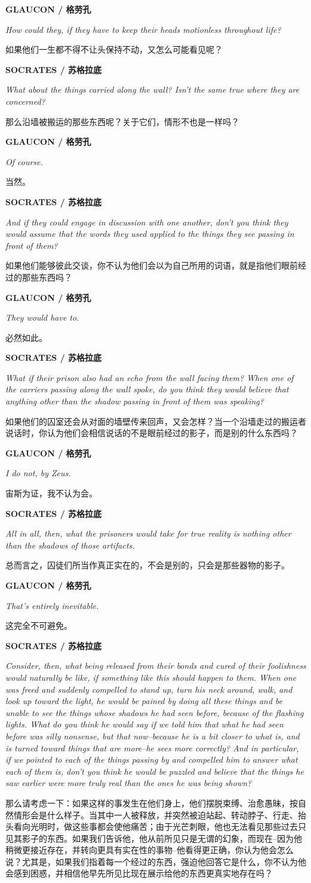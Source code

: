 \documentclass[UTF8]{ctexart}
\newcommand{\speaker}[2]{\par\medskip\noindent\textbf{#1 / #2}\par}
\newcommand{\en}[1]{\noindent\textit{#1}\par}
\newcommand{\zh}[1]{\noindent #1\par}
\begin{document}
\speaker{GLAUCON}{格劳孔}
\en{How could they, if they have to keep their heads motionless throughout life?}
\zh{如果他们一生都不得不让头保持不动，又怎么可能看见呢？}

\speaker{SOCRATES}{苏格拉底}
\en{What about the things carried along the wall? Isn't the same true where they are concerned?}
\zh{那么沿墙被搬运的那些东西呢？关于它们，情形不也是一样吗？}

\speaker{GLAUCON}{格劳孔}
\en{Of course.}
\zh{当然。}

\speaker{SOCRATES}{苏格拉底}
\en{And if they could engage in discussion with one another, don't you think they would assume that the words they used applied to the things they see passing in front of them?}
\zh{如果他们能够彼此交谈，你不认为他们会以为自己所用的词语，就是指他们眼前经过的那些东西吗？}

\speaker{GLAUCON}{格劳孔}
\en{They would have to.}
\zh{必然如此。}

\speaker{SOCRATES}{苏格拉底}
\en{What if their prison also had an echo from the wall facing them? When one of the carriers passing along the wall spoke, do you think they would believe that anything other than the shadow passing in front of them was speaking?}
\zh{如果他们的囚室还会从对面的墙壁传来回声，又会怎样？当一个沿墙走过的搬运者说话时，你认为他们会相信说话的不是眼前经过的影子，而是别的什么东西吗？}

\speaker{GLAUCON}{格劳孔}
\en{I do not, by Zeus.}
\zh{宙斯为证，我不认为会。}

\speaker{SOCRATES}{苏格拉底}
\en{All in all, then, what the prisoners would take for true reality is nothing other than the shadows of those artifacts.}
\zh{总而言之，囚徒们所当作真正实在的，不会是别的，只会是那些器物的影子。}

\speaker{GLAUCON}{格劳孔}
\en{That's entirely inevitable.}
\zh{这完全不可避免。}

\speaker{SOCRATES}{苏格拉底}
\en{Consider, then, what being released from their bonds and cured of their foolishness would naturally be like, if something like this should happen to them. When one was freed and suddenly compelled to stand up, turn his neck around, walk, and look up toward the light, he would be pained by doing all these things and be unable to see the things whose shadows he had seen before, because of the flashing lights. What do you think he would say if we told him that what he had seen before was silly nonsense, but that now--because he is a bit closer to what is, and is turned toward things that are more--he sees more correctly? And in particular, if we pointed to each of the things passing by and compelled him to answer what each of them is, don't you think he would be puzzled and believe that the things he saw earlier were more truly real than the ones he was being shown?}
\zh{那么请考虑一下：如果这样的事发生在他们身上，他们摆脱束缚、治愈愚昧，按自然情形会是什么样子。当其中一人被释放，并突然被迫站起、转动脖子、行走、抬头看向光明时，做这些事都会使他痛苦；由于光芒刺眼，他也无法看见那些过去只见其影子的东西。如果我们告诉他，他从前所见只是无谓的幻象，而现在--因为他稍微更接近存在，并转向更具有实在性的事物--他看得更正确，你认为他会怎么说？尤其是，如果我们指着每一个经过的东西，强迫他回答它是什么，你不认为他会感到困惑，并相信他早先所见比现在展示给他的东西更真实地存在吗？}
\end{document}

